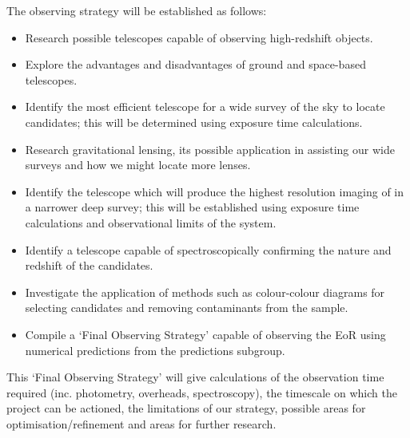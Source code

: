 	The observing strategy will be established as follows:
	\begin{itemize}
		\item Research possible telescopes capable of observing high-redshift objects.
		\item Explore the advantages and disadvantages of ground and space-based telescopes.
		\item Identify the most efficient telescope for a wide survey of the sky to locate candidates; this will be determined using exposure time calculations.
		\item Research gravitational lensing, its possible application in assisting our wide surveys and how we might locate more lenses.
		\item Identify the telescope which will produce the highest resolution imaging of in a narrower deep survey; this will be established using exposure time calculations and observational limits of the system.
		\item Identify a telescope capable of spectroscopically confirming the nature and redshift of the candidates.
		\item Investigate the application of methods such as colour-colour diagrams for selecting candidates and removing contaminants from the sample.
		\item Compile a ‘Final Observing Strategy’ capable of observing the EoR using numerical predictions from the predictions subgroup.
	\end{itemize}
	This `Final Observing Strategy' will give calculations of the observation time required (inc. photometry, overheads, spectroscopy), the timescale on which the project can be actioned, the limitations of our strategy, possible areas for optimisation/refinement and areas for further research.

